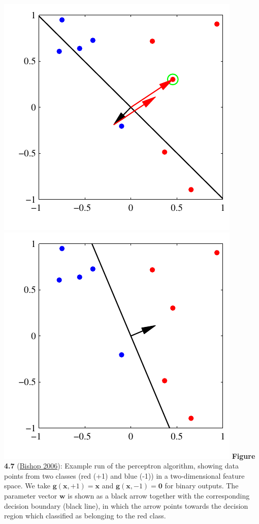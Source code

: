 \documentclass[ignorenonframetext,plain]{beamer}
\renewcommand{\vec}{\mathbf}
\begin{document}
\begin{frame}
\begin{columns}
\includegraphics[height=.4\textheight]{images/bishop-fig-4-7c.pdf}
\includegraphics[height=.4\textheight]{images/bishop-fig-4-7d.pdf}
\footnotesize {\bf Figure 4.7}
(\href{http://research.microsoft.com/en-us/um/people/cmbishop/prml}
       {Bishop 2006}): 
Example run of the perceptron algorithm, showing data points from two
classes (red (+1) and blue (-1)) in a two-dimensional feature
space. We take $\vec{g}(\vec{x}, +1) = \vec{x}$ and $\vec{g}(\vec{x},
-1) = \vec{0}$ for binary outputs.  The parameter vector $\vec{w}$ is
shown as a black arrow together with the corresponding decision
boundary (black line), in which the arrow points towards the decision
region which classified as belonging to the red class.
\end{columns}
\end{frame}
\end{document}
